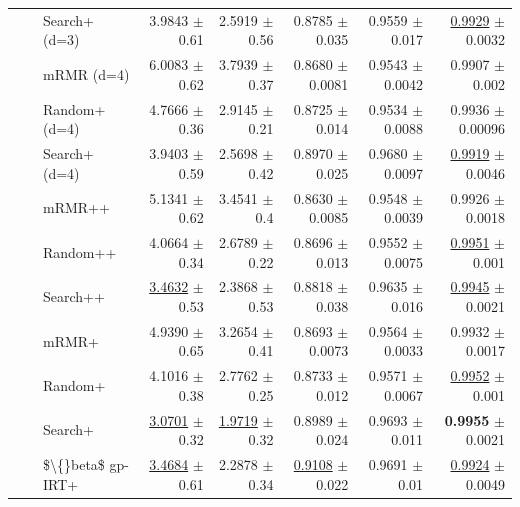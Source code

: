 \begin{longtable}{llp{}rrrrr}
 &  & Search+ (d=3) & 3.9843 {\scriptsize $\pm$ 0.61} & 2.5919 {\scriptsize $\pm$ 0.56} & 0.8785 {\scriptsize $\pm$ 0.035} & 0.9559 {\scriptsize $\pm$ 0.017} & \underline{0.9929} {\scriptsize $\pm$ 0.0032} \\
 &  & mRMR (d=4) & 6.0083 {\scriptsize $\pm$ 0.62} & 3.7939 {\scriptsize $\pm$ 0.37} & 0.8680 {\scriptsize $\pm$ 0.0081} & 0.9543 {\scriptsize $\pm$ 0.0042} & 0.9907 {\scriptsize $\pm$ 0.002} \\
 &  & Random+ (d=4) & 4.7666 {\scriptsize $\pm$ 0.36} & 2.9145 {\scriptsize $\pm$ 0.21} & 0.8725 {\scriptsize $\pm$ 0.014} & 0.9534 {\scriptsize $\pm$ 0.0088} & 0.9936 {\scriptsize $\pm$ 0.00096} \\
 &  & Search+ (d=4) & 3.9403 {\scriptsize $\pm$ 0.59} & 2.5698 {\scriptsize $\pm$ 0.42} & 0.8970 {\scriptsize $\pm$ 0.025} & 0.9680 {\scriptsize $\pm$ 0.0097} & \underline{0.9919} {\scriptsize $\pm$ 0.0046} \\
 &  & mRMR++ & 5.1341 {\scriptsize $\pm$ 0.62} & 3.4541 {\scriptsize $\pm$ 0.4} & 0.8630 {\scriptsize $\pm$ 0.0085} & 0.9548 {\scriptsize $\pm$ 0.0039} & 0.9926 {\scriptsize $\pm$ 0.0018} \\
 &  & Random++ & 4.0664 {\scriptsize $\pm$ 0.34} & 2.6789 {\scriptsize $\pm$ 0.22} & 0.8696 {\scriptsize $\pm$ 0.013} & 0.9552 {\scriptsize $\pm$ 0.0075} & \underline{0.9951} {\scriptsize $\pm$ 0.001} \\
 &  & Search++ & \underline{3.4632} {\scriptsize $\pm$ 0.53} & 2.3868 {\scriptsize $\pm$ 0.53} & 0.8818 {\scriptsize $\pm$ 0.038} & 0.9635 {\scriptsize $\pm$ 0.016} & \underline{0.9945} {\scriptsize $\pm$ 0.0021} \\
 &  & mRMR+ & 4.9390 {\scriptsize $\pm$ 0.65} & 3.2654 {\scriptsize $\pm$ 0.41} & 0.8693 {\scriptsize $\pm$ 0.0073} & 0.9564 {\scriptsize $\pm$ 0.0033} & 0.9932 {\scriptsize $\pm$ 0.0017} \\
 &  & Random+ & 4.1016 {\scriptsize $\pm$ 0.38} & 2.7762 {\scriptsize $\pm$ 0.25} & 0.8733 {\scriptsize $\pm$ 0.012} & 0.9571 {\scriptsize $\pm$ 0.0067} & \underline{0.9952} {\scriptsize $\pm$ 0.001} \\
 &  & Search+ & \underline{3.0701} {\scriptsize $\pm$ 0.32} & \underline{1.9719} {\scriptsize $\pm$ 0.32} & 0.8989 {\scriptsize $\pm$ 0.024} & 0.9693 {\scriptsize $\pm$ 0.011} & \textbf{0.9955} {\scriptsize $\pm$ 0.0021} \\
 &  & \$\textbackslash\{\}beta\$ gp-IRT+ & \underline{3.4684} {\scriptsize $\pm$ 0.61} & 2.2878 {\scriptsize $\pm$ 0.34} & \underline{0.9108} {\scriptsize $\pm$ 0.022} & 0.9691 {\scriptsize $\pm$ 0.01} & \underline{0.9924} {\scriptsize $\pm$ 0.0049} \\

\end{longtable}
